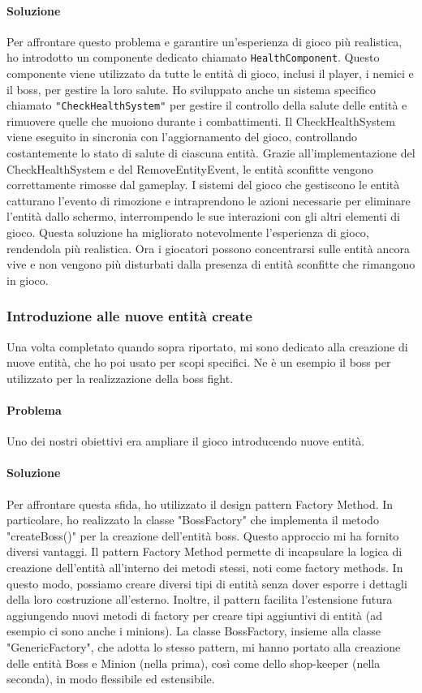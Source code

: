 \documentclass[a4paper,12pt]{report}
\begin{document}
\paragraph*{Soluzione}
Per affrontare questo problema e garantire un'esperienza di gioco più realistica, ho introdotto un componente dedicato chiamato \texttt{HealthComponent}. 
Questo componente viene utilizzato da tutte le entità di gioco, inclusi il player, i nemici e il boss, per gestire la loro salute.
Ho sviluppato anche un sistema specifico chiamato \texttt{"CheckHealthSystem"} per gestire il controllo della salute delle entità e rimuovere quelle che muoiono durante i combattimenti. 
Il CheckHealthSystem viene eseguito in sincronia con l'aggiornamento del gioco, controllando costantemente lo stato di salute di ciascuna entità.
Grazie all'implementazione del CheckHealthSystem e del RemoveEntityEvent, le entità sconfitte vengono correttamente rimosse dal gameplay.
I sistemi del gioco che gestiscono le entità catturano l'evento di rimozione e intraprendono le azioni necessarie per eliminare l'entità dallo schermo, interrompendo le sue interazioni con gli altri elementi di gioco.
Questa soluzione ha migliorato notevolmente l'esperienza di gioco, rendendola più realistica. 
Ora i giocatori possono concentrarsi sulle entità ancora vive e non vengono più disturbati dalla presenza di entità sconfitte che rimangono in gioco.
\subsubsection*{Introduzione alle nuove entità create}
Una volta completato quando sopra riportato, mi sono dedicato alla creazione di nuove entità, che ho poi usato per scopi specifici.
Ne è un esempio il boss per utilizzato per la realizzazione della boss fight.
\paragraph*{Problema}
Uno dei nostri obiettivi era ampliare il gioco introducendo nuove entità.
\paragraph*{Soluzione}
Per affrontare questa sfida, ho utilizzato il design pattern Factory Method.
In particolare, ho realizzato la classe "BossFactory" che implementa il metodo "createBoss()" per la creazione dell'entità boss.
Questo approccio mi ha fornito diversi vantaggi.
Il pattern Factory Method permette di incapsulare la logica di creazione dell'entità all'interno dei metodi stessi, noti come factory methods.
In questo modo, possiamo creare diversi tipi di entità senza dover esporre i dettagli della loro costruzione all'esterno.
Inoltre, il pattern facilita l'estensione futura aggiungendo nuovi metodi di factory per creare tipi aggiuntivi di entità (ad esempio ci sono anche i minions). 
La classe BossFactory, insieme alla classe "GenericFactory", che adotta lo stesso pattern, mi hanno portato alla creazione delle entità Boss e Minion (nella prima), così come dello shop-keeper (nella seconda), in modo flessibile ed estensibile.
\end{document}
